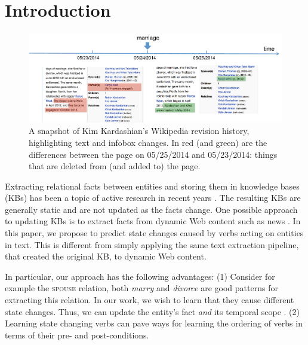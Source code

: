 \section{Introduction}

\begin{figure}[t]
\begin{center}
\includegraphics[width=16cm,keepaspectratio=true]{figures/motivation.pdf}
\caption{\label{fig:motivation} A snapshot of Kim Kardashian's Wikipedia revision history, highlighting text and infobox changes. In red (and green) are the differences between the page on 05/25/2014 and 05/23/2014: things that are deleted from (and  added to) the page.}
\end{center}
\end{figure}

Extracting relational facts between entities and storing them in knowledge bases (KBs) has been a topic of active research in recent years . The resulting  KBs  are generally static  and are not updated as the facts change.  \cite{suchanek2007yago,carlson2010toward,fader2011identifying,MitchellCHTBCMG15}
One possible approach to   updating KBs is to extract facts from dynamic Web content such as news \cite{nakashole2012real}. 
In this  paper, we propose to predict state changes caused by  verbs acting on entities in text. This is different from simply applying the same text extraction pipeline, that created the original KB, to dynamic Web content.

In particular,  our approach has the following advantages: (1) Consider for example the \textsc{spouse} relation, both \textit{marry} and \textit{divorce} are good patterns for extracting this relation. In our work, we wish to learn that they cause different state changes.
Thus,  we can update the entity's fact \textit{and} its temporal scope \cite{wijayactp}. (2) Learning state changing verbs
   can pave ways for learning the ordering of verbs in terms of their  pre- and post-conditions.
   
